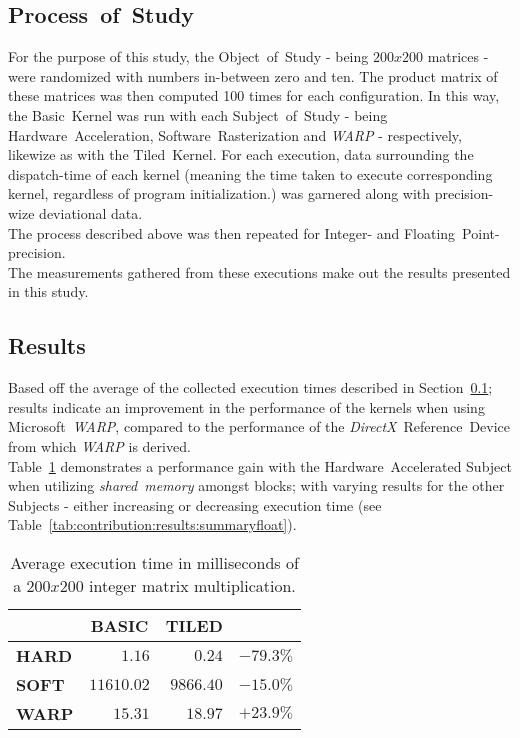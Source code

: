 \documentclass[fleqn,10pt]{SelfArx} %
\begin{document}
\subsection{Process~of~Study}
\label{sec:contribution:processofstudy}
For the purpose of this study, the Object~of~Study - being $200x200$ matrices - were randomized with numbers in-between zero and ten. The product matrix of these matrices was then computed 100 times for each configuration. In this way, the Basic~Kernel was run with each Subject~of~Study - being Hardware~Acceleration, Software~Rasterization and \textit{WARP} - respectively, likewize as with the Tiled~Kernel. For each execution, data surrounding the dispatch-time of each kernel (meaning the time taken to execute corresponding kernel, regardless of program initialization.) was garnered along with precision-wize deviational data.\\
The process described above was then repeated for Integer- and Floating~Point-precision.\\

\noindent
The measurements gathered from these executions make out the results presented in this study.

\subsection{Results}
\label{sec:contribution:results}
Based off the average of the collected execution times described in Section~\ref{sec:contribution:processofstudy}; results indicate an improvement in the performance of the kernels when using Microsoft~\textit{WARP}, compared to the performance of the \textit{DirectX}~Reference~Device from which \textit{WARP} is derived.\\
Table~\ref{tab:contribution:results:summaryint} demonstrates a performance gain with the Hardware~Accelerated Subject when utilizing \textit{shared~memory} amongst blocks; with varying results for the other Subjects - either increasing or decreasing execution time (see Table~\ref{tab:contribution:results:summaryfloat}).

\begin{table}[hbt]
\begin{center}
\begin{tabular}{r|r|r|r|}
	\cline{2-3}
							& \multicolumn{1}{|c|}{\textbf{BASIC}} & \multicolumn{1}{|c|}{\textbf{TILED}}	\\ \hline
	\multicolumn{1}{|l|}{\textbf{HARD}}	& $1.16$			& $0.24$ 	& $-79.3\%$    					\\ \hline
	\multicolumn{1}{|l|}{\textbf{SOFT}}	& $11610.02$		& $9866.40$	& $-15.0\%$     					\\ \hline
	\multicolumn{1}{|l|}{\textbf{WARP}}	& $15.31$			& $18.97$	& $+23.9\%$     					\\ \hline
\end{tabular}
\end{center}
\caption{Average execution time in milliseconds of a $200x200$ integer matrix multiplication.}
\label{tab:contribution:results:summaryint}
\end{table}
\end{document}
